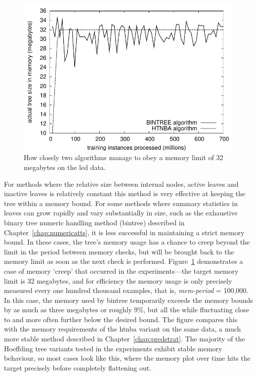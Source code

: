 \begin{figure}
\includegraphics{figures/memslip}
\caption{How closely two algorithms manage to obey a memory limit of 32 megabytes on the {\sc led} data.}
\label{fig:memslip}
\end{figure}

For methods where the relative size between internal nodes, active leaves and inactive leaves is relatively constant this method is very effective at keeping the tree within a memory bound. For some methods where summary statistics in leaves can grow rapidly and vary substantially in size, such as the exhaustive binary tree numeric handling method ({\sc bintree}) described in Chapter~\ref{chap:numericatts}, it is less successful in maintaining a strict memory bound. In these cases, the tree's memory usage has a chance to creep beyond the limit in the period between memory checks, but will be brought back to the memory limit as soon as the next check is performed. Figure~\ref{fig:memslip} demonstrates a case of memory `creep' that occurred in the experiments---the target memory limit is 32 megabytes, and for efficiency the memory usage is only precisely measured every one hundred thousand examples, that is, {\em mem-period} = 100,000. In this case, the memory used by {\sc bintree} temporarily exceeds the memory bounds by as much as three megabytes or roughly 9\%, but all the while fluctuating close to and more often further below the desired bound. The figure compares this with the memory requirements of the {\sc htnba} variant on the same data, a much more stable method described in Chapter~\ref{chap:predstrat}. The majority of the Hoeffding tree variants tested in the experiments exhibit stable memory behaviour, so most cases look like this, where the memory plot over time hits the target precisely before completely flattening out.

